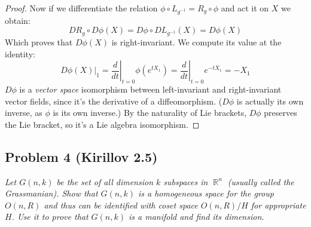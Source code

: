 \documentclass[12 pt]{article}
\DeclareMathOperator {\R} {\mathbb{R}}
\begin{document}
\begin{proof}
Now if we differentiate the relation $\phi\circ L_{g^{-1}} = R_{g} \circ \phi$ and act it on $X$ we obtain:
\[         DR_{g} \circ D\phi  (X)  = D\phi \circ DL_{g^{-1}} (X)  = D\phi (X)    \]
Which proves that $D\phi(X)$ is right-invariant. We compute its value at the identity:
\[      D\phi(X) |_1 = \left.\frac{d}{dt}\right|_{t=0} \phi(e^{tX_1})  = \left.\frac{d}{dt}\right|_{t=0} e^{-tX_1} = -X_1  \]
$D\phi$ is a \emph{vector space} isomorphism between left-invariant and right-invariant vector fields, since it's the derivative of a diffeomorphism. ($D\phi$ is actually its own inverse, as $\phi$ is its own inverse.) By the naturality of Lie brackets, $D\phi$ preserves the Lie bracket, so it's a Lie algebra isomorphism.
\end{proof}


\subsection*{Problem 4 (Kirillov 2.5)}
\emph{Let $G(n,k)$ be the set of all dimension $k$ subspaces in $\R^n$ (usually called the Grassmanian). Show that $G(n,k)$ is a homogeneous space for the group $O(n,R)$ and thus can be identiﬁed with coset space $O(n,R)/H$ for appropriate $H$. Use it to prove that $G(n,k)$ is a manifold and find its dimension.}
\end{document}
